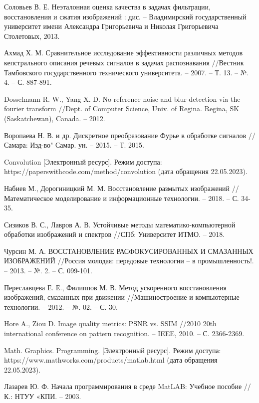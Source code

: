 \begin{thebibliography}{3}
    Соловьев В. Е. Неэталонная оценка качества в задачах фильтрации, восстановления и сжатия изображений : дис. – Владимирский государственный университет имени Александра Григорьевича и Николая Григорьевича Столетовых, 2013.

    Ахмад Х. М. Сравнительное исследование эффективности различных методов кепстрального описания речевых сигналов в задачах распознавания //Вестник Тамбовского государственного технического университета. – 2007. – Т. 13. – №. 4. – С. 887-891.

    Dosselmann R. W., Yang X. D. No-reference noise and blur detection via the fourier transform //Dept. of Computer Science, Univ. of Regina. Regina, SK (Saskatchewan), Canada. – 2012.

    Воропаева Н. В. и др. Дискретное преобразование Фурье в обработке сигналов //Самара: Изд-во" Самар. ун. – 2015. – Т. 2015.

    Convolution [Электронный ресурс]. Режим доступа: https://paperswithcode.com/method/convolution (дата обращения 22.05.2023).

    Набиев М., Дорогиницкий М. М. Восстановление размытых изображений //Математическое моделирование и информационные технологии. – 2018. – С. 34-35.

    Сизиков В. С., Лавров А. В. Устойчивые методы математико-компьютерной обработки изображений и спектров //СПб: Университет ИТМО. – 2018.

    Чурсин М. А. ВОССТАНОВЛЕНИЕ РАСФОКУСИРОВАННЫХ И СМАЗАННЫХ ИЗОБРАЖЕНИЙ //Россия молодая: передовые технологии – в промышленность!. – 2013. – №. 2. – С. 099-101.
    
    Переславцева Е. Е., Филиппов М. В. Метод ускоренного восстановления изображений, смазанных при движении //Машиностроение и компьютерные технологии. – 2012. – №. 02. – С. 30.

    Hore A., Ziou D. Image quality metrics: PSNR vs. SSIM //2010 20th international conference on pattern recognition. – IEEE, 2010. – С. 2366-2369.

    Math. Graphics. Programming. [Электронный ресурс]. Режим доступа: https://www.mathworks.com/products/matlab.html (дата обращения 22.05.2023).

    Лазарев Ю. Ф. Начала программирования в среде MatLAB: Учебное пособие //К.: НТУУ «КПИ. – 2003.


\end{thebibliography}
